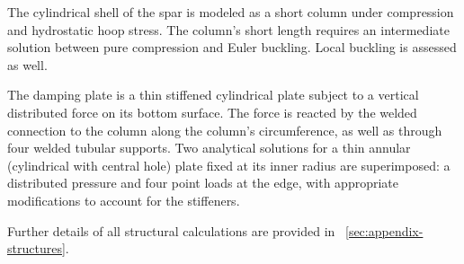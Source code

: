 The cylindrical shell of the spar is modeled as a short column under compression and hydrostatic hoop stress.
The column's short length requires an intermediate solution between pure compression and Euler buckling.
Local buckling is assessed as well.

The damping plate is a thin stiffened cylindrical plate subject to a vertical distributed force on its bottom surface.
The force is reacted by the welded connection to the column along the column's circumference, as well as through four welded tubular supports.
Two analytical solutions for a thin annular (cylindrical with central hole) plate fixed at its inner radius are superimposed: a distributed pressure and four point loads at the edge, with appropriate modifications to account for the stiffeners. 

 Further details of all structural calculations are provided in \appendixname~\ref{sec:appendix-structures}. 


